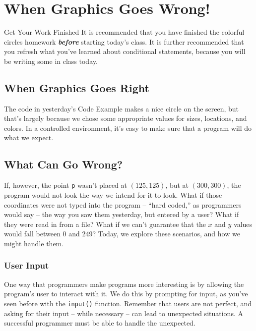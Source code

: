 
\chapter{When Graphics Goes Wrong!}
\label{day:graphics-debugging}


\begin{note}{Get Your Work Finished}
It is recommended that you have finished the colorful circles homework \textbf{\textit{before}} starting today's class.  It is further recommended that you refresh what you've learned about conditional statements, because you will be writing some in class today.
\end{note}

\section{When Graphics Goes Right}
The code in yesterday's Code Example makes a nice circle on the screen, but that's largely because we chose some appropriate values for sizes, locations, and colors.  In a controlled environment, it's easy to make sure that a program will do what we expect.

\section{What Can Go Wrong?}
If, however, the point \texttt{p} wasn't placed at $(125, 125)$, but at $(300, 300)$, the program would not look the way we intend for it to look.  What if those coordinates were not typed into the program -- ``hard coded,'' as programmers would say -- the way you saw them yesterday, but entered by a user?  What if they were read in from a file?  What if we can't guarantee that the $x$ and $y$ values would fall between 0 and 249?  Today, we explore these scenarios, and how we might handle them.

\subsection{User Input}
One way that programmers make programs more interesting is by allowing the program's user to interact with it.  We do this by prompting for input, as you've seen before with the \texttt{input()} function.  Remember that users are not perfect, and asking for their input -- while necessary -- can lead to unexpected situations.  A successful programmer must be able to handle the unexpected.